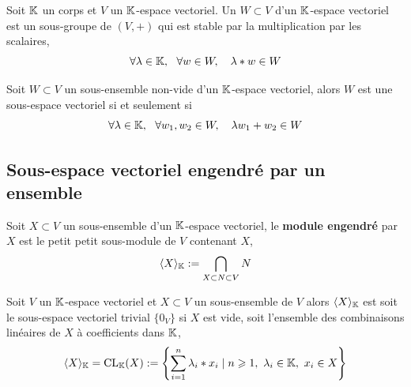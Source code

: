 \begin{definition} \label{def : Sous-espace vectriel}
Soit $\mathbb{K}$ un corps et $V$ un $\mathbb{K}$-espace vectoriel. Un  $W \subset V$ d'un $\mathbb{K}$-espace vectoriel est un sous-groupe de $(V, +)$ qui est stable par la multiplication par les scalaires,
	\[
	\forall \lambda \in \mathbb{K}, ~\ \forall w \in W, \quad \lambda * w \in W
	\]
\end{definition}

\begin{prop} \label{prop: Critère de sous-espace vectoriel}
Soit $W \subset V$ un sous-ensemble non-vide d'un $\mathbb{K}$-espace vectoriel, alors $W$ est une sous-espace vectoriel si et seulement si
	\begin{equation} \label{eq: eq1}
	\forall \lambda \in \mathbb{K}, ~\ \forall w_1, w_2 \in W, \quad \lambda w_1 + w_2 \in W
	\end{equation}
\end{prop}



\subsection{Sous-espace vectoriel engendré par un ensemble}
\begin{definition} \label{def : Sous-espace vectoriel engendré}
Soit $X \subset V$ un sous-ensemble d'un $\mathbb{K}$-espace vectoriel, le \textbf{module engendré} par $X$ est le petit petit sous-module de $V$ contenant $X$,
	\[
	\langle X \rangle_{\mathbb{K}} := \bigcap_{X \subset N \subset V} N
	\]
\end{definition}

\begin{prop}Soit $V$ un $\mathbb{K}$-espace vectoriel et $X \subset V$ un sous-ensemble de $V$ alors $\langle X \rangle_{\mathbb{K}}$ est soit le sous-espace vectoriel trivial $\{0_V\}$ si $X$ est vide, soit l'ensemble des combinaisons linéaires de $X$ à coefficients dans $\mathbb{K}$,
	\[
	\langle X \rangle_{\mathbb{K}} = \operatorname{CL}_{\mathbb{K}}(X) := \left\{ \sum_{i=1}^n \lambda_i * x_i \mid n \geqslant 1, ~ \lambda_i \in \mathbb{K}, ~ x_i \in X\right\}
	\]
\end{prop}

